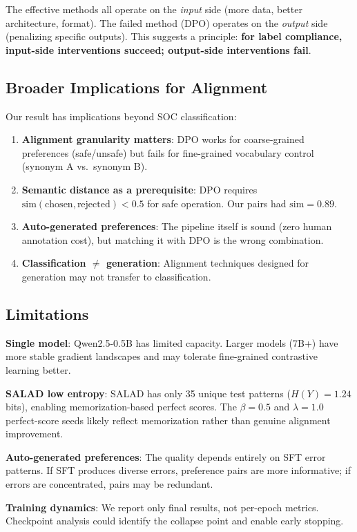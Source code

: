 \documentclass[journal]{IEEEtran}
\begin{document}
The effective methods all operate on the \emph{input} side (more data, better architecture, format). The failed method (DPO) operates on the \emph{output} side (penalizing specific outputs). This suggests a principle: \textbf{for label compliance, input-side interventions succeed; output-side interventions fail}.

\subsection{Broader Implications for Alignment}
Our result has implications beyond SOC classification:

\begin{enumerate}
\item \textbf{Alignment granularity matters}: DPO works for coarse-grained preferences (safe/unsafe) but fails for fine-grained vocabulary control (synonym A vs.\ synonym B).
\item \textbf{Semantic distance as a prerequisite}: DPO requires $\text{sim}(\text{chosen}, \text{rejected}) < 0.5$ for safe operation. Our pairs had $\text{sim} = 0.89$.
\item \textbf{Auto-generated preferences}: The pipeline itself is sound (zero human annotation cost), but matching it with DPO is the wrong combination.
\item \textbf{Classification $\neq$ generation}: Alignment techniques designed for generation may not transfer to classification.
\end{enumerate}

\subsection{Limitations}
\textbf{Single model}: Qwen2.5-0.5B has limited capacity. Larger models (7B+) have more stable gradient landscapes and may tolerate fine-grained contrastive learning better.

\textbf{SALAD low entropy}: SALAD has only 35 unique test patterns ($H(Y) = 1.24$ bits), enabling memorization-based perfect scores. The $\beta = 0.5$ and $\lambda = 1.0$ perfect-score seeds likely reflect memorization rather than genuine alignment improvement.

\textbf{Auto-generated preferences}: The quality depends entirely on SFT error patterns. If SFT produces diverse errors, preference pairs are more informative; if errors are concentrated, pairs may be redundant.

\textbf{Training dynamics}: We report only final results, not per-epoch metrics. Checkpoint analysis could identify the collapse point and enable early stopping.
\end{document}
